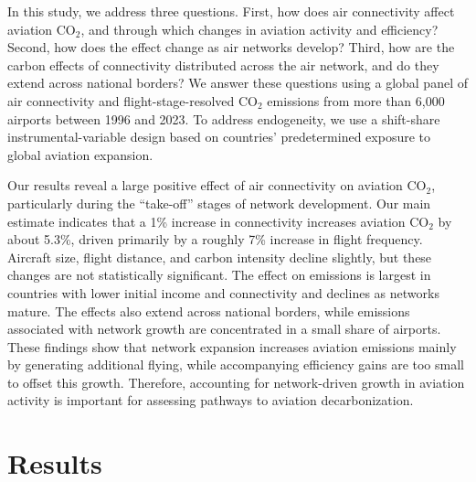 \documentclass[12pt]{extarticle}
\begin{document}
In this study, we address three questions. First, how does air
connectivity affect aviation CO$_2$, and through which changes in
aviation activity and efficiency? Second, how does the effect change as
air networks develop? Third, how are the carbon effects of connectivity
distributed across the air network, and do they extend across national
borders? We answer these questions using a global panel of air
connectivity and flight-stage-resolved CO$_2$ emissions from more than
6{,}000 airports between 1996 and 2023. To address endogeneity, we use a
shift-share instrumental-variable design based on countries'
predetermined exposure to global aviation expansion.

Our results reveal a large positive effect of air connectivity on
aviation CO$_2$, particularly during the ``take-off'' stages of network
development. Our main estimate indicates that a 1\% increase in
connectivity increases aviation CO$_2$ by about 5.3\%, driven primarily
by a roughly 7\% increase in flight frequency. Aircraft size, flight
distance, and carbon intensity decline slightly, but these changes are
not statistically significant. The effect on emissions is largest in
countries with lower initial income and connectivity and declines as
networks mature. The effects also extend across national borders, while
emissions associated with network growth are concentrated in a small
share of airports. These findings show that network expansion increases
aviation emissions mainly by generating additional flying, while
accompanying efficiency gains are too small to offset this growth.
Therefore, accounting for network-driven growth in aviation activity is
important for assessing pathways to aviation decarbonization.

\section*{Results}
\end{document}
